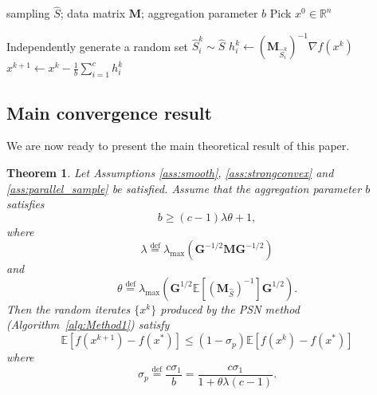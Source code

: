 \documentclass[11pt]{article}
\newtheorem{theorem}{Theorem}
\newcommand{\bM}{\mathbf{M}}
\newcommand{\eqdef}{\overset{\text{def}}{=}}
\renewcommand{\algorithmicrequire}{\textbf{Parameters:}}
\renewcommand{\algorithmicensure}{\textbf{Initialization:}}
\begin{document}
	\begin{algorithm}
		\caption{PSN: Parallel Stochastic Newton Method}
		\label{alg:Method1}
		\renewcommand{\algorithmicrequire}{\textbf{Parameters:}}
		\renewcommand{\algorithmicensure}{\textbf{Initialization:}}
		\begin{algorithmic}[1]
			\Require sampling $\hat{S}$; data matrix $\bM$; aggregation parameter $b$
			\Ensure Pick $x^0 \in \mathbb{R}^n$
			
			\State Independently generate a random set  $\hat{S}^k_i \sim \hat{S}$ 
			\State $h^{k}_i \leftarrow \left(\mathbf{M}_{\hat{S}^k_i}\right)^{-1}\nabla f(x^k)$
			\EndFor
			\State $x^{k+1} \leftarrow x^k - \frac{1}{b}\sum_{i=1}^{c} h^{k}_i$ 
			\EndFor
			
		\end{algorithmic}
	\end{algorithm}	
	
	
	
\subsection{Main convergence result}

	We are now ready to present the main theoretical result of this paper.
	
\begin{theorem}\label{theorem:Parallel_Method_1}
			Let Assumptions \ref{ass:smooth}, \ref{ass:strongconvex} and \ref{ass:parallel_sample} be satisfied. 
 Assume that the aggregation parameter $b$ satisfies
			\begin{equation}\label{eq:b}
			b \geq (c-1)\lambda \theta+1,
			\end{equation}
where
			\begin{equation} \label{eq:lambda}
			\lambda\eqdef\lambda_{\max}\left(\mathbf{G}^{-1/2}\mathbf{M}\mathbf{G}^{-1/2}\right)
			\end{equation}
			and
\begin{equation}\label{eq:a_1}
			\theta \eqdef\lambda_{\max}\left(\mathbf{G}^{1/2}\mathbb{E}\left[\left(\mathbf{M}_{\hat{S}}\right)^{-1}\right]\mathbf{G}^{1/2}\right).
\end{equation}
Then the random iterates $\{x^k\}$ produced by the PSN method (Algorithm~\ref{alg:Method1}) satisfy
			\begin{equation}
			\mathbb{E} \left[f(x^{k+1})-f(x^*) \right]\leq(1-\sigma_p)\mathbb{E} \left[f(x^k)-f(x^*)\right]
			\end{equation}
			where
			\begin{equation}\label{eq:sigma_p}
			\sigma_p\eqdef\frac{c\sigma_1}{b} = \frac{c\sigma_1}{1+ \theta \lambda (c-1)}.
			\end{equation}


		\end{theorem}
\end{document}
